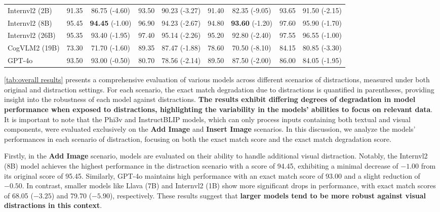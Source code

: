 \begin{table*}[ht]
{\begin{tabular}{l|cc|cc|cc|cc}
    Internvl2 (2B) & 91.35 & 86.75 (-4.60) & 93.50 & 90.23 (-3.27) & 91.40 & 82.35 (-9.05) & 93.65 & 91.50 (-2.15) \\
    Internvl2 (8B) & 95.45 & \textbf{94.45} (-1.00) & 96.90 & 94.23 (-2.67) & 94.80 & \textbf{93.60} (-1.20) & 97.60 & 95.90 (-1.70) \\
    Internvl2 (26B) & 95.35 & 93.40 (-1.95) & 97.40 & 95.14 (-2.26) & 95.20 & 92.80 (-2.40) & 97.55 & 96.55 (-1.00) \\
    CogVLM2 (19B) & 73.30 & 71.70 (-1.60) & 89.35 & 87.47 (-1.88) & 78.60 & 70.50 (-8.10) & 84.15 & 80.85 (-3.30) \\
    GPT-4o & 93.50 & 93.00 (-0.50) & 80.70 & 78.56 (-2.14) & 89.50 & 87.50 (-2.00) & 86.00 & 84.05 (-1.95) \\
    \bottomrule
  \end{tabular}
  }
\end{table*}

\autoref{tab:overall results} presents a comprehensive evaluation of various  models across different scenarios of distractions, measured under both original and distraction settings. For each scenario, the exact match degradation due to distractions is quantified in parentheses, providing insight into the robustness of each model against distractions. \textbf{The results exhibit differing degrees of degradation in model performance when exposed to distractions, highlighting the variability in the models' abilities to focus on relevant data}. It is important to note that the Phi3v and InstructBLIP models, which can only process inputs containing both textual and visual components, were evaluated exclusively on the \textbf{Add Image} and \textbf{Insert Image} scenarios. In this discussion, we analyze the models' performances in each scenario of distraction, focusing on both the exact match score and the exact match degradation score.



Firstly, in the \textbf{Add Image} scenario, models are evaluated on their ability to handle additional visual distraction. Notably, the Internvl2 (8B) model achieves the highest performance in the distraction scenario with a score of 94.45, exhibiting a minimal decrease of $-1.00$ from its original score of 95.45. Similarly, GPT-4o maintains high performance with an exact match score of 93.00 and a slight reduction of $-0.50$. In contrast, smaller models like Llava (7B) and Internvl2 (1B) show more significant drops in performance, with exact match scores of 68.05 ($-3.25$) and 79.70 ($-5.90$), respectively. These results suggest that \textbf{larger models tend to be more robust against visual distractions in this context}.

